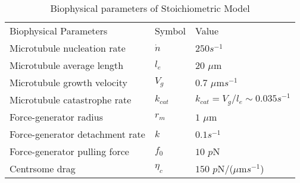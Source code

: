 \documentclass[11pt]{article}
\begin{document}
\begin{table}[h]
\caption{Biophysical parameters of Stoichiometric Model}
\begin{center}
\begin{tabular}{@{}lll@{}}
        \toprule
        Biophysical Parameters & Symbol & Value \\
        \cmidrule(r){1-1}\cmidrule(lr){2-2}\cmidrule(l){3-3}
        Microtubule nucleation rate &  $\dot n$ & $250 s^{-1}$\\
        Microtubule average length & $l_e$ & $20$ $\mu \text{m}$ \\
        Microtubule growth velocity      &   $V_g$   & $0.7$  $\mu\text{m}s^{-1}$ \\
        Microtubule catastrophe rate & $k_{cat}$ & $k_{cat}=V_g/l_e\sim 0.035 s^{-1}$\\
        Force-generator radius &  $r_m$ &  $1$ $\mu\text{m}$\\
        Force-generator detachment rate & $k$  & $0.1 s^{-1}$ \\
        Force-generator pulling force   &  $f_0$  & $10$ $p$N\\
        Centrsome drag       &  $\eta_c$  &  $150$  $p$N/($\mu$m$s^{-1}$)\\
        \bottomrule
\end{tabular}
\end{center}
\end{table}
%
%
%
\end{document}
